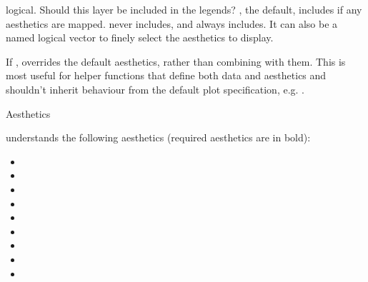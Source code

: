\documentclass[a4paper]{book}
\begin{document}
\begin{Arguments}
\begin{ldescription}
\item[\code{show.legend}] logical. Should this layer be included in the legends?
, the default, includes if any aesthetics are mapped.
 never includes, and  always includes.
It can also be a named logical vector to finely select the aesthetics to
display.

\item[\code{inherit.aes}] If , overrides the default aesthetics,
rather than combining with them. This is most useful for helper functions
that define both data and aesthetics and shouldn't inherit behaviour from
the default plot specification, e.g. .
\end{ldescription}
\end{Arguments}
%
\begin{Section}{Aesthetics}

 understands the following aesthetics (required aesthetics are in bold):
\begin{itemize}

\item{} 
\item{} 
\item{} 
\item{} 
\item{} 
\item{} 
\item{} 
\item{} 
\item{} 

\end{itemize}

\end{Section}
%
\end{document}
